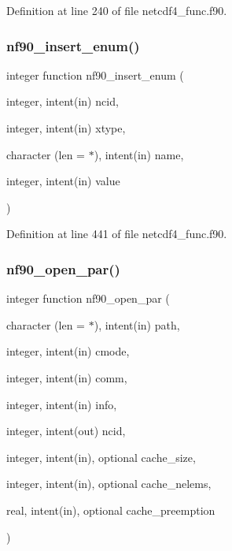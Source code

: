 Definition at line 240 of file netcdf4\+\_\+func.\+f90.

\mbox{\label{netcdf4__func_8f90_ac0d635cd1bdcf36b30d7d6f4a2ef10ca}} 
\subsubsection{\texorpdfstring{nf90\+\_\+insert\+\_\+enum()}{nf90\_insert\_enum()}}
{\footnotesize\ttfamily integer function nf90\+\_\+insert\+\_\+enum (\begin{DoxyParamCaption}\item[{integer, intent(in)}]{ncid,  }\item[{integer, intent(in)}]{xtype,  }\item[{character (len = $\ast$), intent(in)}]{name,  }\item[{integer, intent(in)}]{value }\end{DoxyParamCaption})}



Definition at line 441 of file netcdf4\+\_\+func.\+f90.

\mbox{\label{netcdf4__func_8f90_a74a7fd4b0100efed1931cd05a01ffc49}} 
\subsubsection{\texorpdfstring{nf90\+\_\+open\+\_\+par()}{nf90\_open\_par()}}
{\footnotesize\ttfamily integer function nf90\+\_\+open\+\_\+par (\begin{DoxyParamCaption}\item[{character (len = $\ast$), intent(in)}]{path,  }\item[{integer, intent(in)}]{cmode,  }\item[{integer, intent(in)}]{comm,  }\item[{integer, intent(in)}]{info,  }\item[{integer, intent(out)}]{ncid,  }\item[{integer, intent(in), optional}]{cache\+\_\+size,  }\item[{integer, intent(in), optional}]{cache\+\_\+nelems,  }\item[{real, intent(in), optional}]{cache\+\_\+preemption }\end{DoxyParamCaption})}



